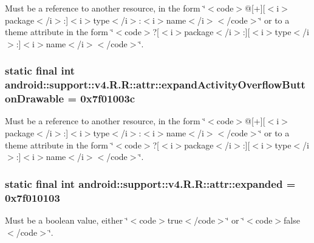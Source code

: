 Must be a reference to another resource, in the form \char`\"{}$<$code$>$@\mbox{[}+\mbox{]}\mbox{[}$<$i$>$package$<$/i$>$:\mbox{]}$<$i$>$type$<$/i$>$:$<$i$>$name$<$/i$>$$<$/code$>$\char`\"{} or to a theme attribute in the form \char`\"{}$<$code$>$?\mbox{[}$<$i$>$package$<$/i$>$:\mbox{]}\mbox{[}$<$i$>$type$<$/i$>$:\mbox{]}$<$i$>$name$<$/i$>$$<$/code$>$\char`\"{}. \hypertarget{classandroid_1_1support_1_1v4_1_1_r_1_1attr_a69106fdafa4c9a0e34c69f57a2a76e2}{
\subsubsection[{expandActivityOverflowButtonDrawable}]{\setlength{\rightskip}{0pt plus 5cm}static final int android::support::v4.R.R::attr::expandActivityOverflowButtonDrawable = 0x7f01003c}}
\label{classandroid_1_1support_1_1v4_1_1_r_1_1attr_a69106fdafa4c9a0e34c69f57a2a76e2}


Must be a reference to another resource, in the form \char`\"{}$<$code$>$@\mbox{[}+\mbox{]}\mbox{[}$<$i$>$package$<$/i$>$:\mbox{]}$<$i$>$type$<$/i$>$:$<$i$>$name$<$/i$>$$<$/code$>$\char`\"{} or to a theme attribute in the form \char`\"{}$<$code$>$?\mbox{[}$<$i$>$package$<$/i$>$:\mbox{]}\mbox{[}$<$i$>$type$<$/i$>$:\mbox{]}$<$i$>$name$<$/i$>$$<$/code$>$\char`\"{}. \hypertarget{classandroid_1_1support_1_1v4_1_1_r_1_1attr_ac6e1f1b318f4c916f7f7e4da3133518}{
\subsubsection[{expanded}]{\setlength{\rightskip}{0pt plus 5cm}static final int android::support::v4.R.R::attr::expanded = 0x7f010103}}
\label{classandroid_1_1support_1_1v4_1_1_r_1_1attr_ac6e1f1b318f4c916f7f7e4da3133518}


Must be a boolean value, either \char`\"{}$<$code$>$true$<$/code$>$\char`\"{} or \char`\"{}$<$code$>$false$<$/code$>$\char`\"{}. 

